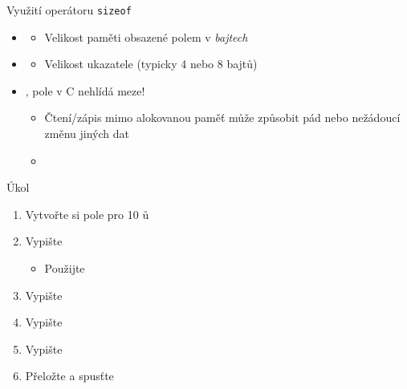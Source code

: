 \begin{frame}{Využití operátoru \texttt{sizeof}}

  \begin{itemize}
    \item {}
    \begin{itemize}
      \item Velikost paměti obsazené polem v \emph{bajtech}
    \end{itemize}

    \pause

    \item {}
    \begin{itemize}
      \item Velikost ukazatele (typicky 4 nebo 8 bajtů)
    \end{itemize}

    \pause

    \item \pozor, pole v C nehlídá meze!
    \begin{itemize}
      \item Čtení/zápis mimo alokovanou paměť může způsobit pád nebo nežádoucí
	změnu jiných dat
      \item {}\\
    \end{itemize}
  \end{itemize}

\end{frame}

\begin{frame}{Úkol}

  \begin{enumerate}
    \item Vytvořte si pole pro 10 ů
    \item Vypište 
    \begin{itemize}
      \item Použijte 
    \end{itemize}

    \item Vypište 
    \item Vypište 
    \item Vypište 
    \item Přeložte a spusťte
  \end{enumerate}

\end{frame}

